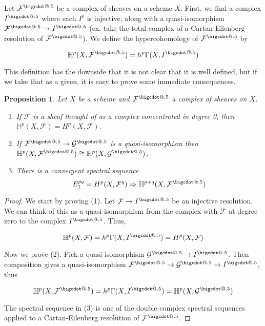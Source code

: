 \documentclass[a4paper]{article}
\makeatletter
\newcommand{\F}{\mathcal{F}}
\newcommand*\bigcdot{\mathpalette\bigcdot@{.5}}
\newcommand*\bigcdot@[2]{\mathbin{\vcenter{\hbox{\scalebox{#2}{$\m@th#1\bullet$}}}}}
\newtheorem{proposition}[theorem]{Proposition}
\numberwithin{theorem}{section}
\numberwithin{equation}{section}
\makeatother
\begin{document}
Let $\F^{\bigcdot}$ be a complex of sheaves on a scheme $X$. First, we find a complex $I^{\bigcdot}$ where each $I^p$ is injective, along with a quasi-isomorphism $\F^{\bigcdot} \rightarrow I^{\bigcdot}$ (ex. take the total complex of a Cartan-Eilenberg resolution of $\F^{\bigcdot}$). We define the hypercohomology of $\F^{\bigcdot}$ by

$$ \mathbb{H}^p(X,\F^{\bigcdot}) = h^p \Gamma(X,I^{\bigcdot}) $$

This definition has the downside that it is not clear that it is well defined, but if we take that as a given, it is easy to prove some immediate consequences.

\begin{proposition} \label{hyper}
    Let $X$ be a scheme and $\F^{\bigcdot}$ a complex of sheaves on $X$.
    \begin{enumerate}
        \item If $\F$ is a sheaf thought of as a complex concentrated in degree 0, then $\mathbb{H}^p(X,\F) = H^p(X,\F)$.
        \item If $\F^{\bigcdot} \rightarrow \mathcal{G}^{\bigcdot}$ is a quasi-isomorphism then $\mathbb{H}^p(X,\F^{\bigcdot}) \cong \mathbb{H}^p(X,\mathcal{G}^{\bigcdot})$.
        \item There is a convergent spectral sequence
        $$ E_1^{pq} = H^p(X,\F^q) \Rightarrow \mathbb{H}^{p+q}(X,\F^{\bigcdot}) $$
    \end{enumerate}
\end{proposition}

\begin{proof}
    We start by proving (1). Let $\F \rightarrow I^{\bigcdot}$ be an injective resolution. We can think of this as a quasi-isomorphism from the complex with $\F$ at degree zero to the complex $I^{\bigcdot}$. Thus,
    
    $$ \mathbb{H}^p(X,\F) = h^p \Gamma(X,I^{\bigcdot}) = H^p(X,\F) $$

    Now we prove (2). Pick a quasi-isomorphism $\mathcal{G}^{\bigcdot} \rightarrow I^{\bigcdot}$. Then composition gives a quasi-isomorphism $\F^{\bigcdot} \rightarrow \mathcal{G}^{\bigcdot} \rightarrow I^{\bigcdot}$, thus

    $$ \mathbb{H}^p(X,\F^{\bigcdot}) = h^p \Gamma(X,I^{\bigcdot}) = \mathbb{H}^p(X,\mathcal{G}^{\bigcdot}) $$

    The spectral sequence in (3) is one of the double complex spectral sequences applied to a Cartan-Eilenberg resolution of $\F^{\bigcdot}$.
    
\end{proof}
\end{document}
